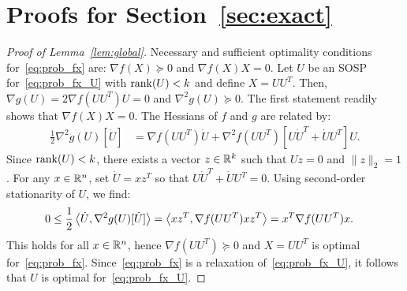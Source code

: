 \section{Proofs for Section~\ref{sec:exact}}\label{app:exact}

\begin{proof}[Proof of Lemma~\ref{lem:global}]
	Necessary and sufficient optimality conditions for~\eqref{eq:prob_fx} are: $\nabla f(X) \succeq 0$ and $\nabla f(X)X = 0$. Let $U$ be an SOSP for~\eqref{eq:prob_fx_U} with $\operatorname{rank}(U) < k$  and define $X = UU^T$. Then, $\nabla g(U) = 2\nabla f(UU^T)U = 0$ and $\nabla^2 g(U) \succeq 0$. The first statement readily shows that $\nabla f(X)X = 0$. The Hessians of $f$ and $g$ are related by:%
	\begin{align*}
		\frac{1}{2}\nabla^2 g(U)[\dot U] & = \nabla f(UU^T)\dot U + \nabla^2 f(UU^T)[U\dot U^T + \dot U U^T]U.
	\end{align*}
	Since $\operatorname{rank}(U) < k$, there exists a vector $z \in \mathbb{R}^{k}$ such that $Uz = 0$ and $\|z\|_2 = 1$. For any $x \in \mathbb{R}^{n}$, set $\dot U = xz^T$ so that $U\dot U^T + \dot U U^T = 0$. Using second-order stationarity of $U$, we find:
	\begin{align*}
		0 \leq \frac{1}{2}\left\langle \dot U, \nabla^2 g(U)[\dot U] \right\rangle & = \left\langle xz^T, \nabla f(UU^T)xz^T \right\rangle = x^T \nabla f(UU^T) x.
	\end{align*}
	This holds for all $x \in \mathbb{R}^{n}$, hence $\nabla f(UU^T) \succeq 0$ and $X = UU^T$ is optimal for~\eqref{eq:prob_fx}. Since~\eqref{eq:prob_fx} is a relaxation of~\eqref{eq:prob_fx_U}, it follows that $U$ is optimal for~\eqref{eq:prob_fx_U}.
\end{proof}



